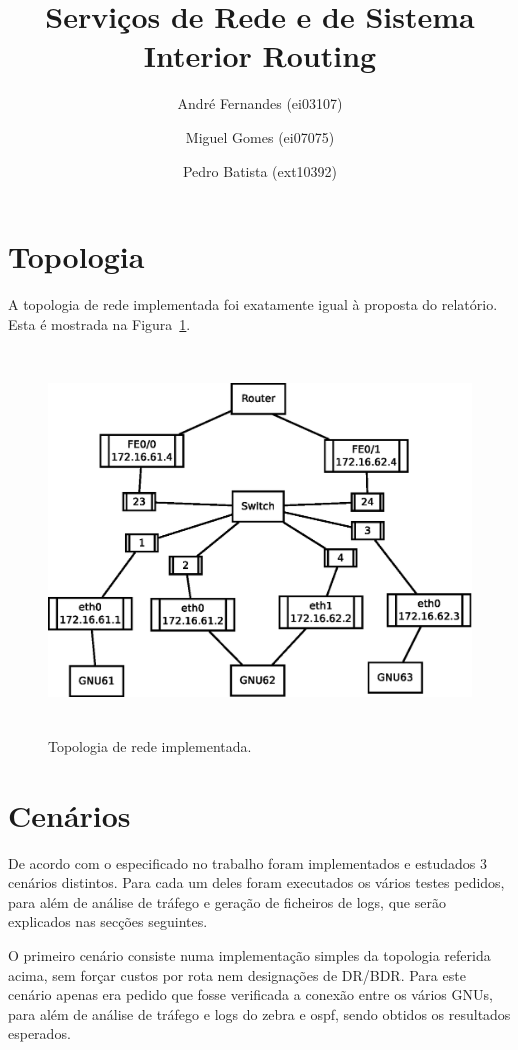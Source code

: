 \documentclass[a4paper,12pt]{article}
\title{Serviços de Rede e de Sistema \\
Interior Routing }
\author{André Fernandes (ei03107) \and Miguel Gomes (ei07075) \and Pedro Batista (ext10392)}
\begin{document}
\maketitle

\section{Topologia}
A topologia de rede implementada foi exatamente igual à proposta do relatório. Esta é mostrada na Figura~\ref{fig:topologia}.

\begin{figure}[htp]
	\begin{center}
		\includegraphics[height=4in]{topologia}
	\end{center}
	\caption{Topologia de rede implementada.}
	\label{fig:topologia}
\end{figure}

\section{Cenários}

	De acordo com o especificado no trabalho foram implementados e estudados 3 cenários distintos. Para cada um deles foram executados os vários testes pedidos, para além de análise de tráfego e geração de ficheiros de logs, que serão explicados nas secções seguintes.
		
	O primeiro cenário consiste numa implementação simples da topologia referida acima, sem forçar custos por rota nem designações de DR/BDR. Para este cenário apenas era pedido que fosse verificada a conexão entre os vários GNUs, para além de análise de tráfego e logs do zebra e ospf, sendo obtidos os resultados esperados.
			
\end{document}
